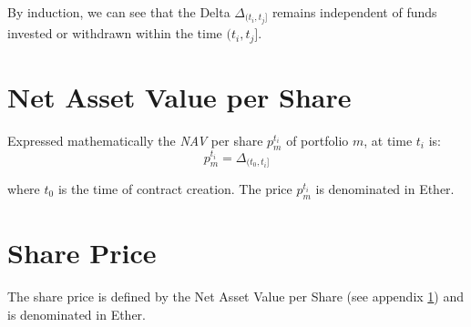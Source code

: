 \documentclass[conference]{IEEEtran}
\begin{document}
By induction, we can see that the Delta $\Delta_{(t_i, t_j]}$ remains independent of funds invested or withdrawn within the time $(t_i, t_j]$.

\section{Net Asset Value per Share}\label{app:defnavps}

Expressed mathematically the \textit{NAV} per share $p_{m}^{t_i}$  of portfolio $m$, at time $t_i$ is:
\begin{equation}
p_{m}^{t_i} = \Delta_{(t_0, t_i]}
\end{equation}

where $t_0$ is the time of contract creation. The price $p_{m}^{t_i}$ is denominated in Ether. 

\section{Share Price}\label{app:defshareprice}

The share price is defined by the Net Asset Value per Share (see appendix \ref{app:defnavps}) and is denominated in Ether.


\end{document}
